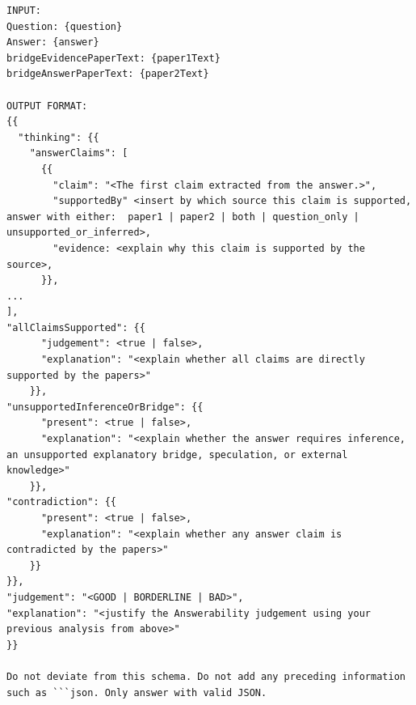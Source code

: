 \begin{lstlisting}[caption={Answerability Prompt}, label={lst:AnswerabilityPrompt}]
INPUT:
Question: {question}
Answer: {answer}
bridgeEvidencePaperText: {paper1Text}
bridgeAnswerPaperText: {paper2Text}

OUTPUT FORMAT:
{{
  "thinking": {{
    "answerClaims": [
      {{
        "claim": "<The first claim extracted from the answer.>",
        "supportedBy" <insert by which source this claim is supported, answer with either:  paper1 | paper2 | both | question_only | unsupported_or_inferred>,
        "evidence: <explain why this claim is supported by the source>,
      }},
...
],
"allClaimsSupported": {{
      "judgement": <true | false>,
      "explanation": "<explain whether all claims are directly supported by the papers>"
    }},
"unsupportedInferenceOrBridge": {{
      "present": <true | false>,
      "explanation": "<explain whether the answer requires inference, an unsupported explanatory bridge, speculation, or external knowledge>"
    }},
"contradiction": {{
      "present": <true | false>,
      "explanation": "<explain whether any answer claim is contradicted by the papers>"
    }}
}},
"judgement": "<GOOD | BORDERLINE | BAD>",
"explanation": "<justify the Answerability judgement using your previous analysis from above>"
}}

Do not deviate from this schema. Do not add any preceding information such as ```json. Only answer with valid JSON.

\end{lstlisting}



